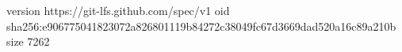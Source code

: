 version https://git-lfs.github.com/spec/v1
oid sha256:e906775041823072a826801119b84272c38049fc67d3669dad520a16c89a210b
size 7262
